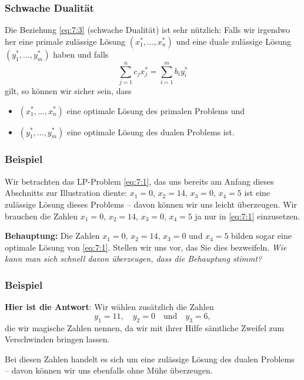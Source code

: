 \documentclass[smaller]{beamer}
\begin{document}
\begin{frame}
\frametitle{Schwache Dualität}
 \alert{Die Beziehung \eqref{eq:7:3} (schwache Dualität) ist sehr nützlich}: Falls wir irgendwo her eine primale zulässige Lösung $(x_1^*, \ldots, x_n^*)$ und eine duale zulässige Lösung $(y_1^*, \ldots, y_m^*)$ haben und falls
\begin{equation}
\label{eq:7:4}
\sum\limits_{j=1}^{n}{c_jx_j^*} = \sum\limits_{i=1}^{m}{b_iy_i^*}
\end{equation}
gilt, so können wir sicher sein, dass
\begin{itemize}
  \item $(x_1^*, \ldots, x_n^*)$ eine optimale Lösung des primalen Problems und
  \item $(y_1^*, \ldots, y_m^*)$ eine optimale Lösung des dualen Problems ist. 
 \end{itemize} 
\end{frame}

\begin{frame}
\frametitle{Beispiel}
 Wir betrachten das LP-Problem \eqref{eq:7:1}, das uns bereits am Anfang dieses Abschnitts zur Illustration diente: $x_1=0$, $x_2=14$, $x_3=0$, $x_4=5$ ist eine zulässige Lösung dieses Problems -- davon können wir uns leicht überzeugen. Wir brauchen die Zahlen $x_1=0$, $x_2=14$, $x_3=0$, $x_4=5$ ja nur in \eqref{eq:7:1} einzusetzen. \\ \vspace*{0.2cm}

 \textbf{Behauptung:} \alert{Die Zahlen $x_1=0$, $x_2=14$, $x_3=0$ und $x_4=5$ bilden sogar eine optimale Lösung von \eqref{eq:7:1}}. Stellen wir uns vor, das Sie dies bezweifeln. \textit{Wie kann man sich schnell davon überzeugen, dass die Behauptung stimmt?}
\end{frame}

\begin{frame}
\frametitle{Beispiel}
\textbf{Hier ist die Antwort}: Wir wählen zusätzlich die Zahlen 
\[
y_1=11,\quad y_2=0 \quad\text{und}\quad y_3=6,
\]
die wir {\glqq}magische Zahlen{\grqq} nennen, da wir mit ihrer Hilfe sämtliche Zweifel zum Verschwinden bringen lassen. \\ \vspace*{0.2cm} 

Bei diesen Zahlen handelt es sich um eine zulässige Lösung des dualen Problems -- davon können wir uns ebenfalls ohne Mühe überzeugen.
\end{frame}
\end{document}
